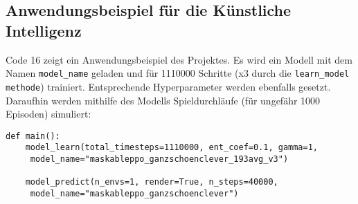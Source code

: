 \subsection{Anwendungsbeispiel für die Künstliche Intelligenz}
\begin{minipage}{\linewidth}
Code 16 zeigt ein Anwendungsbeispiel des Projektes. Es wird ein Modell mit dem Namen \texttt{model\_name} geladen und für 1110000 Schritte (x3 durch die \texttt{learn\_model methode}) trainiert. Entsprechende Hyperparameter werden ebenfalls gesetzt. Daraufhin werden mithilfe des Modells Spieldurchläufe (für ungefähr 1000 Episoden) simuliert:
\vspace{0.5cm}
\begin{lstlisting}[caption={Anwendungsbeispiel für die Künstliche Intelligenz}]
def main():
	model_learn(total_timesteps=1110000, ent_coef=0.1, gamma=1, 
	 model_name="maskableppo_ganzschoenclever_193avg_v3")
	
	model_predict(n_envs=1, render=True, n_steps=40000,
	 model_name="maskableppo_ganzschoenclever")
\end{lstlisting}
\end{minipage}